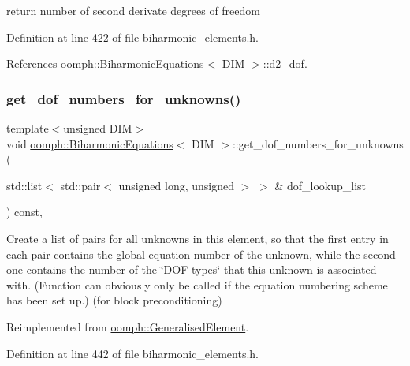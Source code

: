 return number of second derivate degrees of freedom 



Definition at line 422 of file biharmonic\+\_\+elements.\+h.



References oomph\+::\+Biharmonic\+Equations$<$ D\+I\+M $>$\+::d2\+\_\+dof.

\mbox{\label{classoomph_1_1BiharmonicEquations_af36d72e588624eccb8956a3d0d4959b2}} 
\subsubsection{\texorpdfstring{get\+\_\+dof\+\_\+numbers\+\_\+for\+\_\+unknowns()}{get\_dof\_numbers\_for\_unknowns()}}
{\footnotesize\ttfamily template$<$unsigned D\+IM$>$ \\
void \hyperlink{classoomph_1_1BiharmonicEquations}{oomph\+::\+Biharmonic\+Equations}$<$ D\+IM $>$\+::get\+\_\+dof\+\_\+numbers\+\_\+for\+\_\+unknowns (\begin{DoxyParamCaption}\item[{std\+::list$<$ std\+::pair$<$ unsigned long, unsigned $>$ $>$ \&}]{dof\+\_\+lookup\+\_\+list }\end{DoxyParamCaption}) const\hspace{0.3cm}{\ttfamily [inline]}, {\ttfamily [virtual]}}



Create a list of pairs for all unknowns in this element, so that the first entry in each pair contains the global equation number of the unknown, while the second one contains the number of the \char`\"{}\+D\+O\+F types\char`\"{} that this unknown is associated with. (Function can obviously only be called if the equation numbering scheme has been set up.) (for block preconditioning) 



Reimplemented from \hyperlink{classoomph_1_1GeneralisedElement_a069f59bfc3e607a5bebba52c6314d777}{oomph\+::\+Generalised\+Element}.



Definition at line 442 of file biharmonic\+\_\+elements.\+h.



